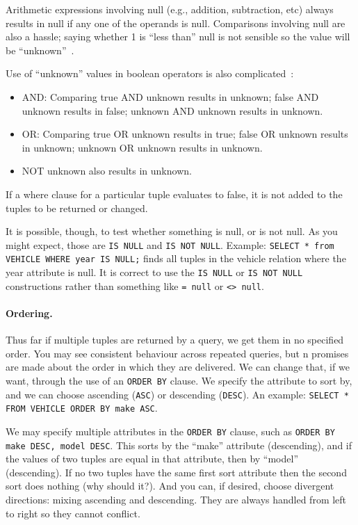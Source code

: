 Arithmetic expressions involving null (e.g., addition, subtraction, etc) always results in null if any one of the operands is null. Comparisons involving null are also a hassle; saying whether 1 is ``less than'' null is not sensible so the value will be ``unknown''~\cite{dsc}.

Use of ``unknown'' values in boolean operators is also complicated~\cite{dsc}:

\begin{itemize}
	\item  AND: Comparing true AND unknown results in unknown; false AND unknown results in false; unknown AND unknown results in unknown.
	\item OR: Comparing true OR unknown results in true; false OR unknown results in unknown; unknown OR unknown results in unknown.
	\item NOT unknown also results in unknown.
\end{itemize}

If a where clause for a particular tuple evaluates to false, it is not added to the tuples to be returned or changed. 

It is possible, though, to test whether something is null, or is not null. As you might expect, those are \texttt{IS NULL} and \texttt{IS NOT NULL}. Example: \texttt{SELECT * from VEHICLE WHERE year IS NULL;} finds all tuples in the vehicle relation where the year attribute is null. It is correct to use the \texttt{IS NULL} or \texttt{IS NOT NULL} constructions rather than something like \texttt{= null} or \texttt{<> null}.


\paragraph{Ordering.} Thus far if multiple tuples are returned by a query, we get them in no specified order. You may see consistent behaviour across repeated queries, but n promises are made about the order in which they are delivered. We can change that, if we want, through the use of an \texttt{ORDER BY} clause. We specify the attribute to sort by, and we can choose ascending (\texttt{ASC}) or descending (\texttt{DESC}). An example: \texttt{SELECT * FROM VEHICLE ORDER BY make ASC}.

We may specify multiple attributes in the \texttt{ORDER BY} clause, such as \texttt{ORDER BY make DESC, model DESC}. This sorts by the ``make'' attribute (descending), and if the values of two tuples are equal in that attribute, then by ``model'' (descending). If no two tuples have the same first sort attribute then the second sort does nothing (why should it?). And you can, if desired, choose divergent directions: mixing ascending and descending. They are always handled from left to right so they cannot conflict.

